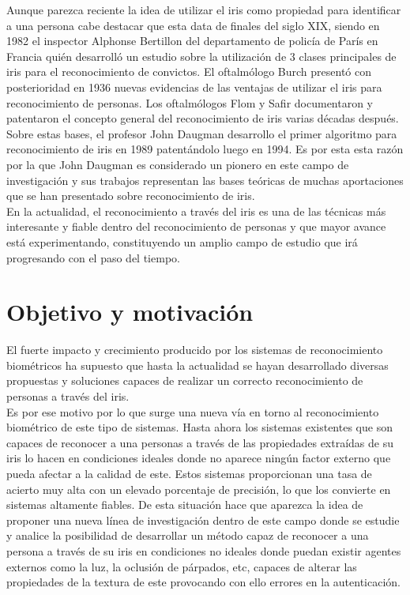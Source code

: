 Aunque parezca reciente la idea de utilizar el iris como propiedad para identificar a una persona cabe destacar que esta data de finales del siglo XIX, siendo en 1982 el inspector Alphonse Bertillon del departamento de policía de París en Francia quién desarrolló un estudio sobre la utilización de 3 clases principales de iris para el reconocimiento de convictos. El oftalmólogo Burch presentó con posterioridad en 1936 nuevas evidencias de las ventajas de utilizar el iris para reconocimiento de personas. Los oftalmólogos Flom y Safir documentaron y patentaron el concepto general del reconocimiento de iris varias décadas después. Sobre estas bases, el profesor John Daugman desarrollo el primer algoritmo para reconocimiento de iris en 1989 patentándolo luego en 1994. Es por esta esta razón por la que John Daugman es considerado un pionero en este campo de investigación y sus trabajos representan las bases teóricas de muchas aportaciones que se han presentado sobre reconocimiento de iris. \\

En la actualidad, el reconocimiento a través del iris es una de las técnicas más interesante y fiable dentro del reconocimiento de personas y que mayor avance está experimentando, constituyendo un amplio campo de estudio que irá progresando con el paso del tiempo. \\



\section{Objetivo y motivación}
El fuerte impacto y crecimiento producido por los sistemas de reconocimiento biométricos ha supuesto que hasta la actualidad se hayan desarrollado diversas propuestas y soluciones capaces de realizar un correcto reconocimiento de personas a través del iris.\\

Es por ese motivo por lo que surge una nueva vía en torno al reconocimiento biométrico de este tipo de sistemas. Hasta ahora los sistemas existentes que son capaces de reconocer a una personas a través de las propiedades extraídas de su iris lo hacen en condiciones ideales donde no aparece ningún factor externo que pueda afectar a la calidad de este. Estos sistemas proporcionan una tasa de acierto muy alta con un elevado porcentaje de precisión, lo que los convierte en sistemas altamente fiables. De esta situación hace que aparezca la idea de proponer una nueva línea de investigación dentro de este campo donde se estudie y analice la posibilidad de desarrollar un método capaz de reconocer a una persona a través de su iris en condiciones no ideales donde puedan existir agentes externos como la luz, la oclusión de párpados, etc, capaces de alterar las propiedades de la textura de este provocando con ello errores en la autenticación.  \\

